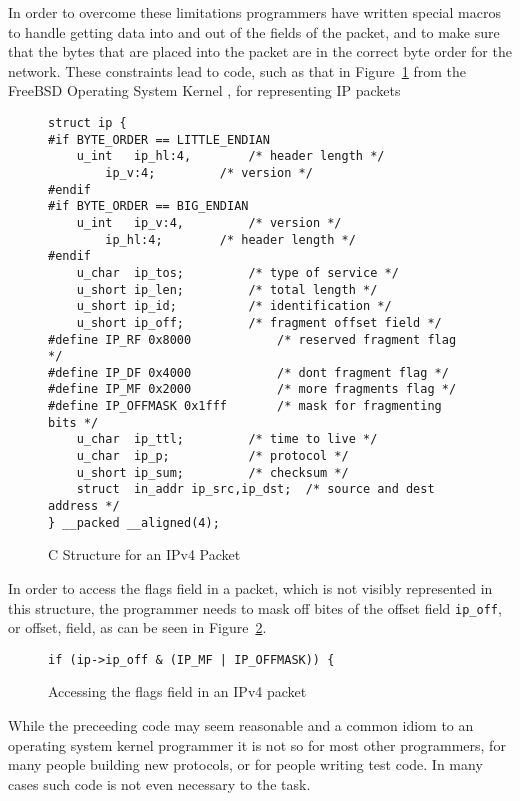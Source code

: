 \documentclass{sig-alternate-10pt}
\begin{document}
In order to overcome these limitations programmers have written
special macros to handle getting data into and out of the fields of
the packet, and to make sure that the bytes that are placed into the
packet are in the correct byte order for the network.  These
constraints lead to code, such as that in
Figure~\ref{fig:c-structure-for-an-ipv4-packet} from the FreeBSD
Operating System Kernel \cite{McKusick}, for representing IP packets

\begin{figure}
  \centering
\begin{verbatim}
struct ip {
#if BYTE_ORDER == LITTLE_ENDIAN
	u_int	ip_hl:4,		/* header length */
		ip_v:4;			/* version */
#endif
#if BYTE_ORDER == BIG_ENDIAN
	u_int	ip_v:4,			/* version */
		ip_hl:4;		/* header length */
#endif
	u_char	ip_tos;			/* type of service */
	u_short	ip_len;			/* total length */
	u_short	ip_id;			/* identification */
	u_short	ip_off;			/* fragment offset field */
#define	IP_RF 0x8000			/* reserved fragment flag */
#define	IP_DF 0x4000			/* dont fragment flag */
#define	IP_MF 0x2000			/* more fragments flag */
#define	IP_OFFMASK 0x1fff		/* mask for fragmenting bits */
	u_char	ip_ttl;			/* time to live */
	u_char	ip_p;			/* protocol */
	u_short	ip_sum;			/* checksum */
	struct	in_addr ip_src,ip_dst;	/* source and dest address */
} __packed __aligned(4);
\end{verbatim}
  \caption{C Structure for an IPv4 Packet}
  \label{fig:c-structure-for-an-ipv4-packet}
\end{figure}

In order to access the flags field in a packet, which is not visibly
represented in this structure, the programmer needs to mask off bites
of the offset field \verb|ip_off|, or offset, field, as can be seen in
Figure~\ref{fig:accessing-the-flags-field}.

\begin{figure}
  \centering
\begin{verbatim}
if (ip->ip_off & (IP_MF | IP_OFFMASK)) {  
\end{verbatim}
  \caption{Accessing the flags field in an IPv4 packet}
  \label{fig:accessing-the-flags-field}
\end{figure}

While the preceeding code may seem reasonable and a common idiom to an
operating system kernel programmer it is not so for most other
programmers, for many people building new protocols, or for people
writing test code.  In many cases such code is not even necessary to
the task.
\end{document}
